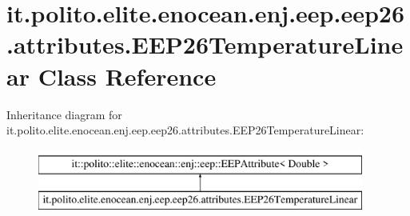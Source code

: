 \hypertarget{classit_1_1polito_1_1elite_1_1enocean_1_1enj_1_1eep_1_1eep26_1_1attributes_1_1_e_e_p26_temperature_linear}{}\section{it.\+polito.\+elite.\+enocean.\+enj.\+eep.\+eep26.\+attributes.\+E\+E\+P26\+Temperature\+Linear Class Reference}
\label{classit_1_1polito_1_1elite_1_1enocean_1_1enj_1_1eep_1_1eep26_1_1attributes_1_1_e_e_p26_temperature_linear}
Inheritance diagram for it.\+polito.\+elite.\+enocean.\+enj.\+eep.\+eep26.\+attributes.\+E\+E\+P26\+Temperature\+Linear\+:\begin{figure}[H]
\begin{center}
\leavevmode
\includegraphics[height=2.000000cm]{classit_1_1polito_1_1elite_1_1enocean_1_1enj_1_1eep_1_1eep26_1_1attributes_1_1_e_e_p26_temperature_linear}
\end{center}
\end{figure}
